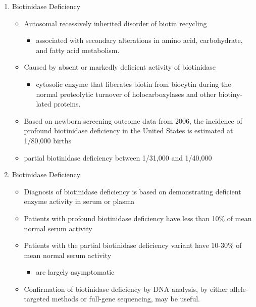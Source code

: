 \documentclass{scrartcl}
\begin{document}
\begin{enumerate}
\item Biotinidase Deficiency
\label{sec:org4af1472}

\begin{itemize}
\item Autosomal recessively inherited disorder of biotin recycling
\begin{itemize}
\item associated with secondary alterations in amino acid, carbohydrate,
and fatty acid metabolism.
\end{itemize}
\item Caused by absent or markedly deficient activity of biotinidase
\begin{itemize}
\item cytosolic enzyme that liberates biotin from biocytin during the
normal proteolytic turnover of holocarboxylases and other
biotiny-lated proteins.
\end{itemize}

\item Based on newborn screening outcome data from 2006, the incidence of
profound biotinidase deficiency in the United States is estimated at
1/80,000 births
\item partial biotinidase deficiency between 1/31,000 and 1/40,000
\end{itemize}

\item Biotinidase Deficiency
\label{sec:orgc807560}

\begin{itemize}
\item Diagnosis of biotinidase deficiency is based on demonstrating
deficient enzyme activity in serum or plasma

\item Patients with profound biotinidase deficiency have less than 10\% of
mean normal serum activity

\item Patients with the partial biotinidase deficiency variant have 10-30\%
of mean normal serum activity
\begin{itemize}
\item are largely asymptomatic
\end{itemize}

\item Confirmation of biotinidase deficiency by DNA analysis, by either
allele-targeted methods or full-gene sequencing, may be useful.
\end{itemize}


\end{enumerate}
\end{document}
